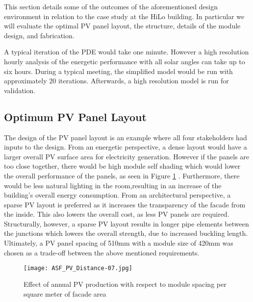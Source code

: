 

This section details some of the outcomes of the aforementioned design environment in relation to the case study at the HiLo building. In particular we will evaluate the optimal PV panel layout, the structure, details of the module design, and fabrication.

A typical iteration of the PDE would take one minute. However a high resolution hourly analysis of the energetic performance with all solar angles can take up to six hours. During a typical meeting, the simplified model would be run with approximately 20 iterations. Afterwards, a high resolution model is run for validation.

\subsection{Optimum PV Panel Layout}
The design of the PV panel layout is an example where all four stakeholders had inputs to the design. From an energetic perspective, a dense layout would have a larger overall PV surface area for electricity generation. However if the panels are too close together, there would be high module self shading which would lower the overall performance of the panels, as seen in Figure \ref{fig:spacing} \cite{hofer2016parametric}. Furthermore, there would be less natural lighting in the room,resulting in an increase of the building's overall  energy consumption. From an architectural perspective, a sparse PV layout is preferred as it increases the transparency of the facade from the inside. This also lowers the overall cost, as less PV panels are required. Structurally, however, a sparse PV layout results in longer pipe elements between the junctions which lowers the overall strength, due to increased buckling length. Ultimately, a PV panel spacing of 510mm with a module size of 420mm was chosen as a trade-off between the above mentioned requirements. 

\begin{figure}
\begin{center}
\texttt{[image: ASF\_PV\_Distance-07.jpg]}
\caption{Effect of annual PV production with respect to module spacing per square meter of facade area \cite{hofer2016parametric}}
\label{fig:spacing}
\end{center}
\end{figure}

